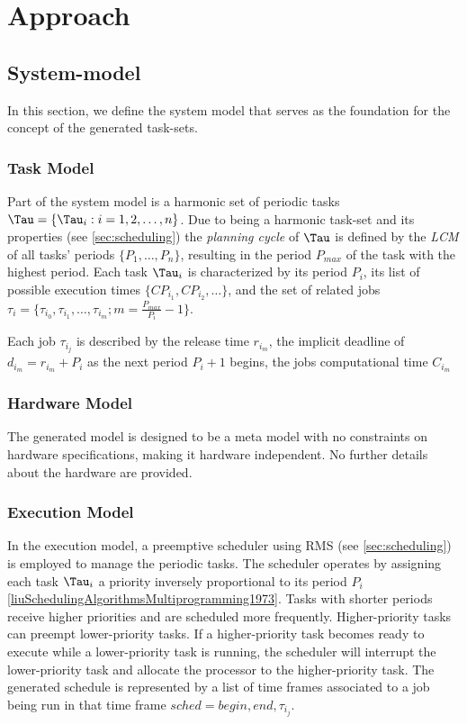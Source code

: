\chapter{Approach}
\section{System-model}
\label{sec:model}
In this section, we define the system model that serves as the foundation for the concept of the generated task-sets.

\subsection{Task Model}
\label{sec:task_model}
Part of the system model is a harmonic set of periodic tasks $\Tau=\{\Tau_i: i = 1, 2, \ldots, n\}$.
Due to being a harmonic task-set and its properties (see \cref{sec:scheduling}) the \textit{planning cycle}\cite{dar-tzenpengAssignmentSchedulingCommunicating1997} of $\Tau$ is defined by the \textit{\ac{LCM}} of all tasks' periods $\{P_1, \ldots, P_n\}$, resulting in the period $P_{max}$ of the task with the highest period.
Each task $\Tau_i$ is characterized by its period $P_i$, its list of possible execution times $\{CP_{i_1}, CP_{i_2}, \ldots\}$, and the set of related jobs $\tau_i=\{\tau_{i_0}, \tau_{i_1}, \dots, \tau_{i_m}; m = \frac{P_{max}}{P_i} - 1\}$.

Each job $\tau_{i_j}$ is described by the release time $r_{i_m}$, the implicit deadline of $d_{i_m} = r_{i_m} + P_i$ as the next period $P_i+1$ begins, the jobs computational time $C_{i_m}$

\subsection{Hardware Model}
\label{sec:hardware_model}
The generated model is designed to be a meta model with no constraints on hardware specifications, making it hardware independent.
No further details about the hardware are provided.

\subsection{Execution Model}
\label{sec:execution_model}
In the execution model, a preemptive scheduler using \ac{RMS} (see \cref{sec:scheduling}) is employed to manage the periodic tasks. 
The scheduler operates by assigning each task $\Tau_i$ a priority inversely proportional to its period $P_i$ \ref{liuSchedulingAlgorithmsMultiprogramming1973}.
Tasks with shorter periods receive higher priorities and are scheduled more frequently.
Higher-priority tasks can preempt lower-priority tasks.
If a higher-priority task becomes ready to execute while a lower-priority task is running, the scheduler will interrupt the lower-priority task and allocate the processor to the higher-priority task.
The generated schedule is represented by a list of time frames associated to a job being run in that time frame $sched = {begin, end, \tau_{i_j}}$.

